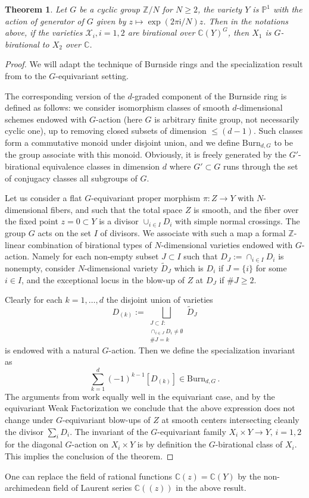 \documentclass[12pt,a4paper]{amsart}
\newtheorem{theorem}{Theorem}[section]
\theoremstyle{definition}
\theoremstyle{remark}
\newcommand{\Z}{\mathbb{Z}}
\newcommand{\C}{\mathbb{C}}
\newcommand{\PP}{\mathbb{P}}
\begin{document}
\begin{theorem}
    Let $G$ be a cyclic group $\Z/N$ for $N\ge 2$, the variety $Y$ is $\PP^1$ with the action of generator of $G$ given by $z\mapsto \exp(2\pi \mathsf i/N)z$. Then in the notations above, if the varieties $\mathcal X_i, i=1,2$ are birational over $\C(Y)^G$, then $X_1$ is $G$-birational to $X_2$ over $\C$.
\end{theorem}
\begin{proof}
    We will adapt the technique of Burnside rings and the specialization result from \cite{Kontsevich2019} to the $G$-equivariant setting. 

    The corresponding version of the $d$-graded component of the Burnside ring is defined as follows:
     we consider isomorphism classes of smooth $d$-dimensional schemes endowed with $G$-action (here $G$ is arbitrary finite group, not necessarily cyclic one), up to removing  closed subsets of dimension $\le (d-1)$. Such classes form a commutative monoid under disjoint union, and we define $\mathrm{Burn}_{d,G}$ to be the group associate with this monoid. Obviously, it is freely generated by the $G'$-birational equivalence classes in dimension $d$ where $G'\subset G$ runs through the set of conjugacy classes all subgroups of $G$. 
     
    Let us consider a flat $G$-equivariant proper morphism
    $\pi:Z\to Y$ with $N$-dimensional fibers, and such that the total space $Z$ is smooth, and the fiber over the fixed point $z=0\subset Y$ is a divisor $\cup_{i\in I} D_i$ with simple normal crossings. The group $G$ acts on the set $I$ of divisors. We associate with such a map a formal $\Z$-linear combination of birational types of $N$-dimensional varieties endowed with $G$-action. Namely for each non-empty subset $J\subset I$ such that $D_J:=\cap_{i\in I} D_i$ is nonempty, consider $N$-dimensional variety  $\widetilde D_J$ which is $D_i$ if $J=\{i\}$ for some $i\in I$, and the exceptional locus in the blow-up of $Z$ at $D_J$ if $\# J\ge 2$. 
    
    Clearly for each $k=1,\dots,d$ the disjoint union of varieties 
    $$D_{(k)}:=\bigsqcup_{\substack{J\subset I:\\\cap_{i\in J}D_i\ne\emptyset\\ \# J=k}}\widetilde D_J$$
    is endowed with a natural $G$-action.
    Then we define the specialization invariant as 
    $$\sum_{k=1}^d (-1)^{k-1} [D_{(k)}]\in \mathrm{Burn}_{d,G}\,.$$
The arguments from \cite{Kontsevich2019} work equally well in the equivariant case, and by the equivariant Weak Factorization we conclude that the above expression does not change under $G$-equivariant blow-ups of $Z$ at smooth centers intersecting cleanly the divisor $\sum_i D_i$. The invariant of the $G$-equivariant family $X_i\times Y\to Y,\,i=1,2$ for the diagonal $G$-action on $X_i\times Y$ is by definition the $G$-birational class of $X_i$. This implies the conclusion of the theorem.
\end{proof}
One can replace the field of rational functions  $\C(z)=\C(Y)$ by the non-archimedean field of Laurent series $\C(\!(z)\!)$ in the above result.
\end{document}
